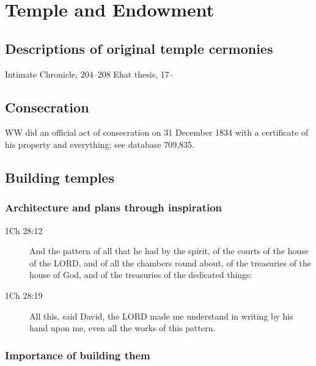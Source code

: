 \section{Temple and Endowment}

	\subsection{Descriptions of original temple cermonies}
	
		Intimate Chronicle, 204--208
		Ehat thesis, 17--
		
	\subsection{Consecration} %
	
		WW did an official act of consecration on 31 December 1834 with a certificate of his property and everything; see database 709,835.

	\subsection{Building temples} %
	
		\subsubsection{Architecture and plans through inspiration}
		
			\begin{description}
			\item[1Ch 28:12] And the pattern of all that he had by the spirit, of the courts of the house of the LORD, and of all the chambers round about, of the treasuries of the house of God, and of the treasuries of the dedicated things:
			\item[1Ch 28:19] All this, said David, the LORD made me understand in writing by his hand upon me, even all the works of this pattern.
			\end{description}
		
		\subsubsection{Importance of building them}
		
